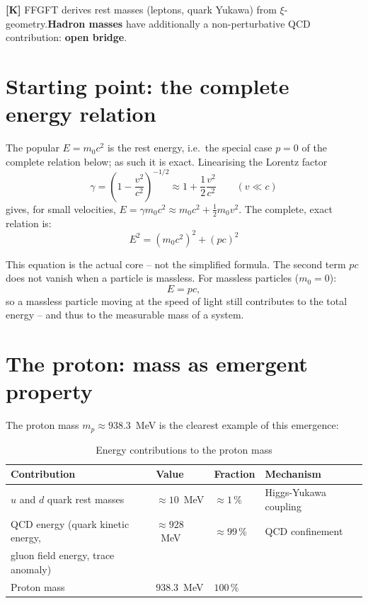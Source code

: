 \begin{keyresult}
\textbf{[K]} FFGFT derives rest masses (leptons, quark Yukawa) from
$\xi$-geometry.\quad \textbf{Hadron masses} have additionally a
non-perturbative QCD contribution: \textbf{open bridge}.
\end{keyresult}

\section{Starting point: the complete energy relation}

The popular $E = m_0 c^2$ is the rest energy, i.e.\ the special case
$p = 0$ of the complete relation below; as such it is exact.
Linearising the Lorentz factor
\begin{equation}
  \gamma = \left(1 - \frac{v^2}{c^2}\right)^{-1/2}
  \approx 1 + \frac{1}{2}\frac{v^2}{c^2}
  \qquad (v \ll c)
\end{equation}
gives, for small velocities, $E = \gamma m_0c^2 \approx m_0c^2
+ \tfrac12 m_0v^2$. The complete,
exact relation is:
\begin{equation}
  \boxed{E^2 = (m_0 c^2)^2 + (pc)^2}
  \label{eq:full_energy}
\end{equation}

This equation is the actual core -- not the simplified formula. The
second term $pc$ does not vanish when a particle is massless. For
massless particles ($m_0 = 0$):
\begin{equation}
  E = pc,
\end{equation}
so a massless particle moving at the speed of light still contributes
to the total energy -- and thus to the measurable mass of a system.

\section{The proton: mass as emergent property}

The proton mass $m_p \approx 938.3$~MeV is the clearest example of
this emergence:

\begin{table}[h]
\centering
\caption{Energy contributions to the proton mass}
\label{tab:proton_en}
\begin{tabular}{llll}
\toprule
Contribution & Value & Fraction & Mechanism \\
\midrule
$u$ and $d$ quark rest masses & $\approx 10$~MeV & $\approx 1\,\%$
  & Higgs-Yukawa coupling \\
QCD energy (quark kinetic energy, & $\approx 928$~MeV & $\approx 99\,\%$
  & QCD confinement \\
\quad gluon field energy, trace anomaly) & & & \\
\midrule
Proton mass & $938.3$~MeV & $100\,\%$ & \\
\bottomrule
\end{tabular}
\end{table}

